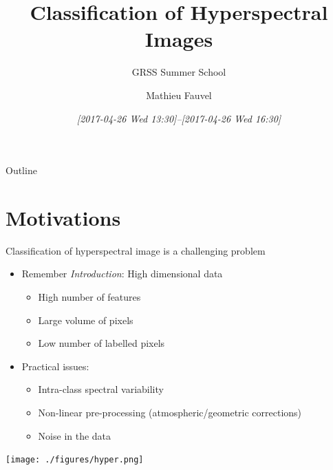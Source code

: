 \documentclass[10pt,aspectratio=1610]{beamer}
\author{Mathieu Fauvel}
\date{\textit{[2017-04-26 Wed 13:30]--[2017-04-26 Wed 16:30]}}
\title{Classification of Hyperspectral Images}
\subtitle{GRSS Summer School}
\institute{UMR Dynafor}
\begin{document}
\maketitle
\begin{frame}{Outline}
\tableofcontents
\end{frame}

\section{Motivations}
\label{sec:org13dd03d}
\begin{frame}[label={sec:orgfced2c9}]{Classification of hyperspectral image is a challenging problem}
\begin{itemize}
\item Remember \emph{Introduction}: \alert{High dimensional data}
\begin{itemize}
\item High number of features
\item Large volume of pixels
\item Low number of labelled pixels
\end{itemize}
\item Practical issues:
\begin{itemize}
\item Intra-class spectral variability
\item Non-linear pre-processing (atmospheric/geometric corrections)
\item Noise in the data
\end{itemize}
\end{itemize}

\begin{center}
\begin{center}
\texttt{[image: ./figures/hyper.png]}
\end{center}
\end{center}
\end{frame}
\end{document}
